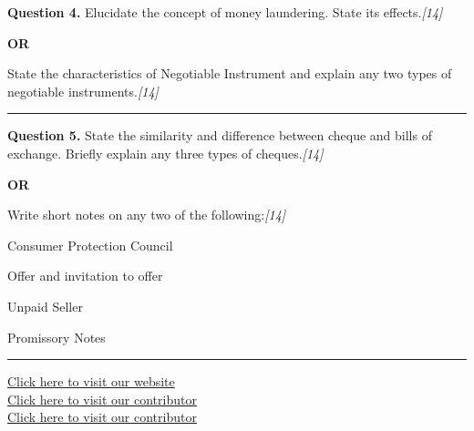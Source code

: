 \documentclass[11pt,a4paper]{article}
\newcommand{\pts}[1]{\hfill   \textit{[#1]}}
\begin{document}
\noindent   \textbf{Question 4.}
Elucidate the concept of money laundering. State its effects.\pts{14}

\centerline{   \textbf{OR}}

State the characteristics of Negotiable Instrument and explain any two types of negotiable instruments.\pts{14}

\medskip\rule{\linewidth}{0.2pt}




\noindent   \textbf{Question 5.}
State the similarity and difference between cheque and bills of exchange. Briefly explain any three types of cheques.\pts{14}

\centerline{   \textbf{OR}}

Write short notes on any two of the following:\pts{14}

\begin{parts}
  \item Consumer Protection Council
  \item Offer and invitation to offer
  \item Unpaid Seller
  \item Promissory Notes
\end{parts}

\vfill
\rule{\linewidth}{0.4pt}

\begin{center}\small
\href{https://bhu-exam.vercel.app/}{Click here to visit our website}\\[4pt]
\href{https://me-aryan.vercel.app/}{Click here to visit our contributor}\\[4pt]
\href{https://quashan-me.vercel.app/}{Click here to visit our contributor}
\end{center}
\end{document}
